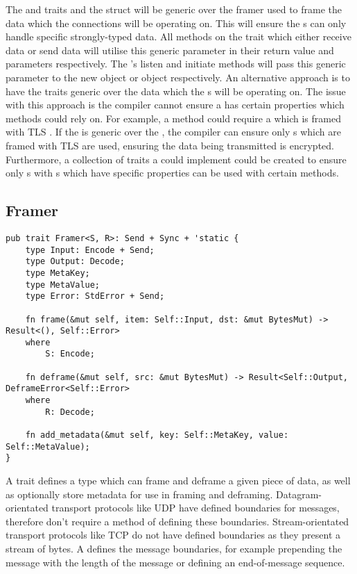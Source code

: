 The \connection{} and \listener{} traits and the \preconnection{} struct will be generic over the framer
used to frame the data which the connections will be operating on.
This will ensure the \connection{}s can only handle specific strongly-typed data.
All methods on the \connection{} trait which either receive data or send data will utilise this generic parameter in
their return value and parameters respectively.
The \preconnection{}'s listen and initiate methods will pass this generic parameter to the new \listener{}
object or \connection{} object respectively.
An alternative approach is to have the traits generic over the data which the \connection{}s will be operating on.
The issue with this approach is the compiler cannot ensure a \connection{} has certain properties which methods
could rely on.
For example, a method could require a \connection{} which is framed with TLS .
If the \connection{} is generic over the \framer{}, the compiler can ensure only \connection{}s which are
framed with TLS are used, ensuring the data being transmitted is encrypted.
Furthermore, a collection of traits a \framer{} could implement could be created to ensure only \connection{}s
with \framer{}s which have specific properties can be used with certain methods.

\subsection{Framer}\label{subsec:framer}
\begin{lstlisting}[float=h, label=lst:framer, caption={The Framer trait, showing the Send and 'static
requirements for all implementers, and associated types.}]
pub trait Framer<S, R>: Send + Sync + 'static {
    type Input: Encode + Send;
    type Output: Decode;
    type MetaKey;
    type MetaValue;
    type Error: StdError + Send;

    fn frame(&mut self, item: Self::Input, dst: &mut BytesMut) -> Result<(), Self::Error>
    where
        S: Encode;

    fn deframe(&mut self, src: &mut BytesMut) -> Result<Self::Output, DeframeError<Self::Error>
    where
        R: Decode;

    fn add_metadata(&mut self, key: Self::MetaKey, value: Self::MetaValue);
}
\end{lstlisting}

A \framer{} trait defines a type which can frame and deframe a given piece of data, as well as optionally store
metadata for use in framing and deframing.
Datagram-orientated transport protocols like UDP have defined boundaries for messages, therefore don't require a method
of defining these boundaries.
Stream-orientated transport protocols like TCP do not have defined boundaries as they present a stream of bytes.
A \framer{} defines the message boundaries, for example prepending the message with the length of the message or
defining an end-of-message sequence.

